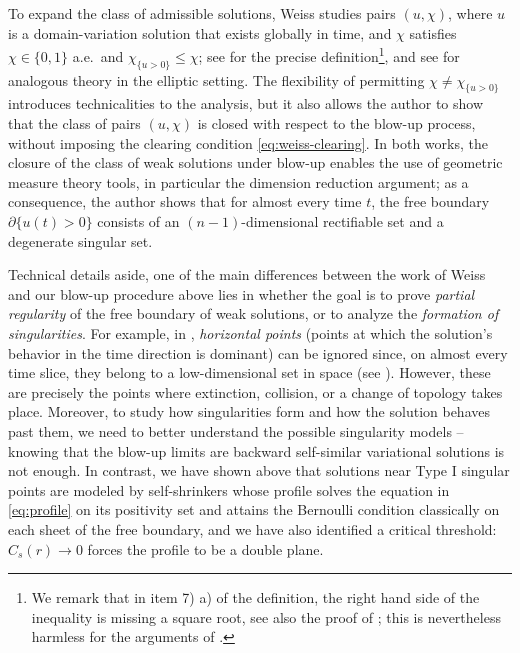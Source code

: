\documentclass[11pt]{article}
\numberwithin{equation}{section}
\theoremstyle{definition}
\begin{document}
To expand the class of admissible solutions, Weiss \cite{Weiss} studies pairs $(u,\chi)$, where $u$ is a domain-variation solution that exists globally in time, and $\chi$ satisfies $\chi \in \{0,1\}$ a.e.\ and $\chi_{\{u>0\}} \leq \chi$; see \cite[Definition 6.1]{Weiss} for the precise definition\footnote{We remark that in item 7) a) of the definition, the right hand side of the inequality is missing a square root, see also the proof of \cite[Lemma 5.1]{Weiss}; this is nevertheless harmless for the arguments of \cite{Weiss}.}, and see \cite{KW25} for analogous theory in the elliptic setting. The flexibility of permitting $\chi \neq \chi_{\{u>0\}}$ introduces technicalities to the analysis, but it also allows the author to show that the class of pairs $(u,\chi)$ is closed with respect to the blow-up process, without imposing the clearing condition \eqref{eq:weiss-clearing}. In both works, the closure of the class of weak solutions under blow-up enables the use of geometric measure theory tools, in particular the dimension reduction argument; as a consequence, the author shows that for almost every time $t$, the free boundary $\partial\{u(t)>0\}$ consists of an $(n-1)$-dimensional rectifiable set and a degenerate singular set. 

Technical details aside, one of the main differences between the work of Weiss and our blow-up procedure above lies in whether the goal is to prove \emph{partial regularity} of the free boundary of weak solutions, or to analyze the \emph{formation of singularities}. For example, in \cite{Weiss}, \emph{horizontal points} (points at which the solution's behavior in the time direction is dominant) can be ignored since, on almost every time slice, they belong to a low-dimensional set in space (see \cite[Lemmas 7.2 and 11.3]{Weiss}). However, these are precisely the points where extinction, collision, or a change of topology takes place. Moreover, to study how singularities form and how the solution behaves past them, we need to better understand the possible singularity models -- knowing that the blow-up limits are backward self-similar variational solutions is not enough. In contrast, we have shown above that solutions near Type I singular points are modeled by self-shrinkers whose profile solves the equation in \eqref{eq:profile} on its positivity set and attains the Bernoulli condition classically on each sheet of the free boundary, and we have also identified a critical threshold: $C_s(r)\to0$ forces the profile to be a double plane. 
\end{document}
